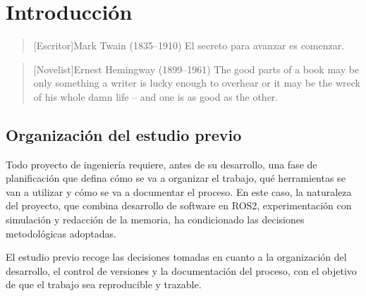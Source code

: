 \chapter{Introducción}

\begin{quotation}[Escritor]{Mark Twain (1835--1910)}
El secreto para avanzar es comenzar.
\end{quotation}

\begin{quotation}[Novelist]{Ernest Hemingway (1899--1961)}
The good parts of a book may be only something a writer is lucky enough to overhear or it may be the wreck of his whole damn life -- and one is as good as the other.
\end{quotation}

\begin{abstract}
Este capítulo presenta el punto de partida del proyecto: cómo se ha organizado el desarrollo, qué herramientas se han utilizado y cómo se ha documentado el proceso a lo largo del trabajo.
\end{abstract}

\section{Organización del estudio previo}

Todo proyecto de ingeniería requiere, antes de su desarrollo, una fase de planificación que defina cómo se va a organizar el trabajo, qué herramientas se van a utilizar y cómo se va a documentar el proceso. En este caso, la naturaleza del proyecto, que combina desarrollo de software en ROS2, experimentación con simulación y redacción de la memoria, ha condicionado las decisiones metodológicas adoptadas.

El estudio previo recoge las decisiones tomadas en cuanto a la organización del desarrollo, el control de versiones y la documentación del proceso, con el objetivo de que el trabajo sea reproducible y trazable.
